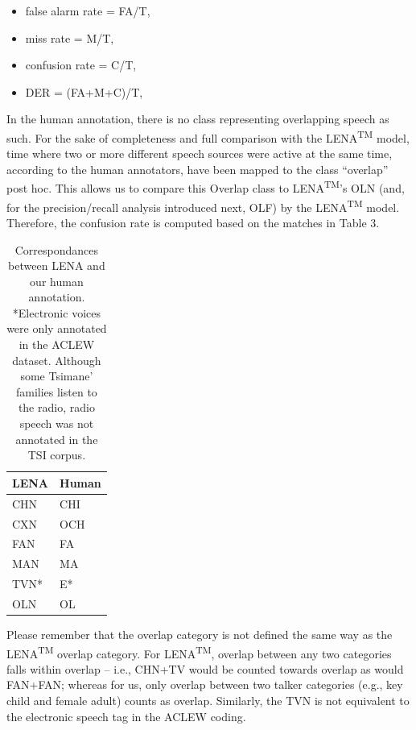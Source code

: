 \documentclass[english,floatsintext,man]{apa6}
\providecommand{\tightlist}{%
  \setlength{\itemsep}{0pt}\setlength{\parskip}{0pt}}
\begin{document}
\begin{itemize}
\tightlist
\item
  false alarm rate = FA/T,
\item
  miss rate = M/T,
\item
  confusion rate = C/T,
\item
  DER = (FA+M+C)/T,
\end{itemize}

In the human annotation, there is no class representing overlapping
speech as such. For the sake of completeness and full comparison with
the LENA\textsuperscript{TM} model, time where two or more different
speech sources were active at the same time, according to the human
annotators, have been mapped to the class \enquote{overlap} post hoc.
This allows us to compare this Overlap class to
LENA\textsuperscript{TM}'s OLN (and, for the precision/recall analysis
introduced next, OLF) by the LENA\textsuperscript{TM} model. Therefore,
the confusion rate is computed based on the matches in Table 3.

\begin{table}[t]

\caption{\label{tab:tab-tsicor}Correspondances between LENA and our human annotation. *Electronic voices were only annotated in the ACLEW dataset. Although some Tsimane' families listen to the radio, radio speech was not annotated in the TSI corpus.}
\centering
\begin{tabular}{>{\raggedright\arraybackslash}p{2cm}>{\raggedright\arraybackslash}p{2cm}}
\toprule
LENA & Human\\
\midrule
CHN & CHI\\
CXN & OCH\\
FAN & FA\\
MAN & MA\\
TVN* & E*\\
\addlinespace
OLN & OL\\
\bottomrule
\end{tabular}
\end{table}

Please remember that the overlap category is not defined the same way as
the LENA\textsuperscript{TM} overlap category. For
LENA\textsuperscript{TM}, overlap between any two categories falls
within overlap -- i.e., CHN+TV would be counted towards overlap as would
FAN+FAN; whereas for us, only overlap between two talker categories
(e.g., key child and female adult) counts as overlap. Similarly, the TVN
is not equivalent to the electronic speech tag in the ACLEW coding.
\end{document}
